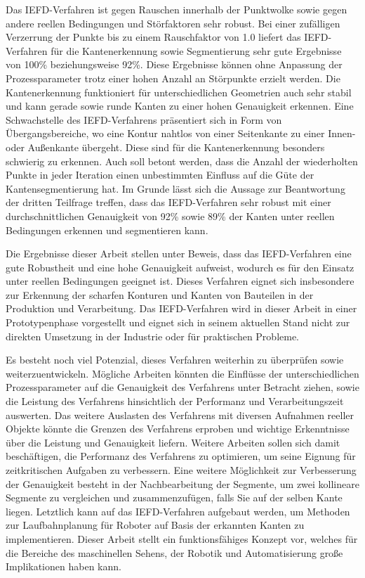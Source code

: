 Das IEFD-Verfahren ist gegen Rauschen innerhalb der Punktwolke sowie gegen andere reellen Bedingungen und Störfaktoren sehr robust. Bei einer zufälligen Verzerrung der Punkte bis zu einem Rauschfaktor von 1.0 liefert das IEFD-Verfahren für die Kantenerkennung sowie Segmentierung sehr gute Ergebnisse von 100\% beziehungsweise 92\%. Diese Ergebnisse können ohne Anpassung der Prozessparameter trotz einer hohen Anzahl an Störpunkte erzielt werden. Die Kantenerkennung funktioniert für unterschiedlichen Geometrien auch sehr stabil und kann gerade sowie runde Kanten zu einer hohen Genauigkeit erkennen. Eine Schwachstelle des IEFD-Verfahrens präsentiert sich in Form von Übergangsbereiche, wo eine Kontur nahtlos von einer Seitenkante zu einer Innen- oder Außenkante übergeht. Diese sind für die Kantenerkennung besonders schwierig zu erkennen. Auch soll betont werden, dass die Anzahl der wiederholten Punkte in jeder Iteration einen unbestimmten Einfluss auf die Güte der Kantensegmentierung hat. Im Grunde lässt sich die Aussage zur Beantwortung der dritten Teilfrage treffen, dass das IEFD-Verfahren sehr robust mit einer durchschnittlichen Genauigkeit von 92\% sowie 89\% der Kanten unter reellen Bedingungen erkennen und segmentieren kann. 

Die Ergebnisse dieser Arbeit stellen unter Beweis, dass das IEFD-Verfahren eine gute Robustheit und eine hohe Genauigkeit aufweist, wodurch es für den Einsatz unter reellen Bedingungen geeignet ist. Dieses Verfahren eignet sich insbesondere zur Erkennung der scharfen Konturen und Kanten von Bauteilen in der Produktion und Verarbeitung. Das IEFD-Verfahren wird in dieser Arbeit in einer Prototypenphase vorgestellt und eignet sich in seinem aktuellen Stand nicht zur direkten Umsetzung in der Industrie oder für praktischen Probleme. 

Es besteht noch viel Potenzial, dieses Verfahren weiterhin zu überprüfen sowie weiterzuentwickeln. Mögliche Arbeiten könnten die Einflüsse der unterschiedlichen Prozessparameter auf die Genauigkeit des Verfahrens unter Betracht ziehen, sowie die Leistung des Verfahrens hinsichtlich der Performanz und Verarbeitungszeit auswerten. Das weitere Auslasten des Verfahrens mit diversen Aufnahmen reeller Objekte könnte die Grenzen des Verfahrens erproben und wichtige Erkenntnisse über die Leistung und Genauigkeit liefern. Weitere Arbeiten sollen sich damit beschäftigen, die Performanz des Verfahrens zu optimieren, um seine Eignung für zeitkritischen Aufgaben zu verbessern. Eine weitere Möglichkeit zur Verbesserung der Genauigkeit besteht in der Nachbearbeitung der Segmente, um zwei kollineare Segmente zu vergleichen und zusammenzufügen, falls Sie auf der selben Kante liegen. Letztlich kann auf das IEFD-Verfahren aufgebaut werden, um Methoden zur Laufbahnplanung für Roboter auf Basis der erkannten Kanten zu implementieren. Dieser Arbeit stellt ein funktionsfähiges Konzept vor, welches für die Bereiche des maschinellen Sehens, der Robotik und Automatisierung große Implikationen haben kann.